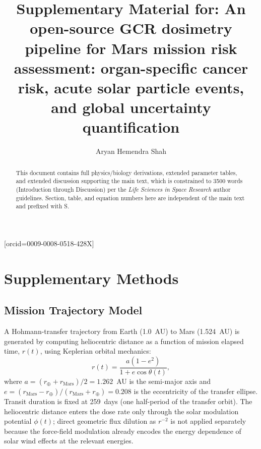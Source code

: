 \documentclass[a4paper,fleqn]{cas-sc}
\begin{document}
\let\WriteBookmarks\relax
\def\floatpagepagefraction{1}
\def\textpagefraction{.001}


\title[mode=title]{Supplementary Material for: An open-source GCR
dosimetry pipeline for Mars mission risk assessment: organ-specific
cancer risk, acute solar particle events, and global uncertainty
quantification}

\author[1]{Aryan Hemendra Shah}[orcid=0009-0008-0518-428X]
\cormark[1]



\begin{abstract}
This document contains full physics/biology derivations, extended parameter
tables, and extended discussion supporting the main text, which is
constrained to 3500 words (Introduction through Discussion) per the
\emph{Life Sciences in Space Research} author guidelines. Section, table,
and equation numbers here are independent of the main text and prefixed
with S.
\end{abstract}

\maketitle

\tableofcontents

\section{Supplementary Methods}

\subsection{Mission Trajectory Model}

A Hohmann-transfer trajectory from Earth (1.0~AU) to Mars (1.524~AU) is
generated by computing heliocentric distance as a function of mission elapsed
time, $r(t)$, using Keplerian orbital mechanics:
\begin{equation}
  r(t) = \frac{a(1-e^2)}{1 + e\cos\theta(t)},
\end{equation}
where $a = (r_\oplus + r_\mathrm{Mars})/2 = 1.262$~AU is the semi-major axis
and $e = (r_\mathrm{Mars} - r_\oplus)/(r_\mathrm{Mars} + r_\oplus) = 0.208$
is the eccentricity of the transfer ellipse. Transit duration is fixed at
259~days (one half-period of the transfer orbit). The heliocentric distance
enters the dose rate only through the solar modulation potential $\phi(t)$;
direct geometric flux dilution as $r^{-2}$ is not applied separately because
the force-field modulation already encodes the energy dependence of solar
wind effects at the relevant energies.
\end{document}
